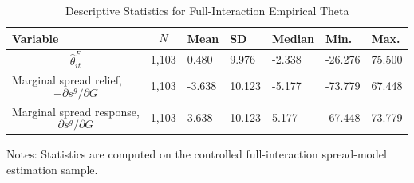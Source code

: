 \begin{table}[H]\centering
\begin{threeparttable}
\caption{Descriptive Statistics for Full-Interaction Empirical Theta}
\label{tab:theta_descriptive_stats}
\scriptsize
\begin{tabularx}{\textwidth}{lYYYYYY}
\toprule
Variable & $$N$$ & Mean & SD & Median & Min. & Max. \\
\midrule
$$\widehat{\theta}^{F}_{it}$$ & 1,103 & 0.480 & 9.976 & -2.338 & -26.276 & 75.500 \\
Marginal spread relief, $$-\partial s^g/\partial G$$ & 1,103 & -3.638 & 10.123 & -5.177 & -73.779 & 67.448 \\
Marginal spread response, $$\partial s^g/\partial G$$ & 1,103 & 3.638 & 10.123 & 5.177 & -67.448 & 73.779 \\
\bottomrule
\end{tabularx}
\begin{tablenotes}[flushleft]\footnotesize
\item Notes: Statistics are computed on the controlled full-interaction spread-model estimation sample.
\end{tablenotes}
\end{threeparttable}
\end{table}
